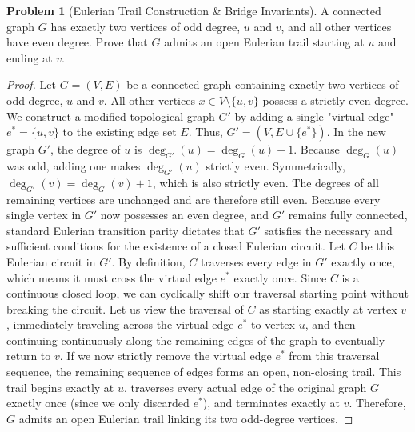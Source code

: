 \documentclass[11pt, a4paper]{article}
\theoremstyle{definition}
\newtheorem{problem}{Problem}
\theoremstyle{plain}
\begin{document}
\vspace{0.5cm}

\begin{problem}[Eulerian Trail Construction \& Bridge Invariants]
A connected graph $G$ has exactly two vertices of odd degree, $u$ and $v$, and all other vertices have even degree. Prove that $G$ admits an open Eulerian trail starting at $u$ and ending at $v$.
\end{problem}

\begin{proof}
Let $G = (V, E)$ be a connected graph containing exactly two vertices of odd degree, $u$ and $v$. All other vertices $x \in V \setminus \{u, v\}$ possess a strictly even degree.
We construct a modified topological graph $G'$ by adding a single "virtual edge" $e^* = \{u, v\}$ to the existing edge set $E$. Thus, $G' = (V, E \cup \{e^*\})$.
In the new graph $G'$, the degree of $u$ is $\deg_{G'}(u) = \deg_G(u) + 1$. Because $\deg_G(u)$ was odd, adding one makes $\deg_{G'}(u)$ strictly even.
Symmetrically, $\deg_{G'}(v) = \deg_G(v) + 1$, which is also strictly even. The degrees of all remaining vertices are unchanged and are therefore still even.
Because every single vertex in $G'$ now possesses an even degree, and $G'$ remains fully connected, standard Eulerian transition parity dictates that $G'$ satisfies the necessary and sufficient conditions for the existence of a closed Eulerian circuit.
Let $C$ be this Eulerian circuit in $G'$. By definition, $C$ traverses every edge in $G'$ exactly once, which means it must cross the virtual edge $e^*$ exactly once.
Since $C$ is a continuous closed loop, we can cyclically shift our traversal starting point without breaking the circuit. Let us view the traversal of $C$ as starting exactly at vertex $v$, immediately traveling across the virtual edge $e^*$ to vertex $u$, and then continuing continuously along the remaining edges of the graph to eventually return to $v$.
If we now strictly remove the virtual edge $e^*$ from this traversal sequence, the remaining sequence of edges forms an open, non-closing trail. 
This trail begins exactly at $u$, traverses every actual edge of the original graph $G$ exactly once (since we only discarded $e^*$), and terminates exactly at $v$.
Therefore, $G$ admits an open Eulerian trail linking its two odd-degree vertices.
\end{proof}
\end{document}

